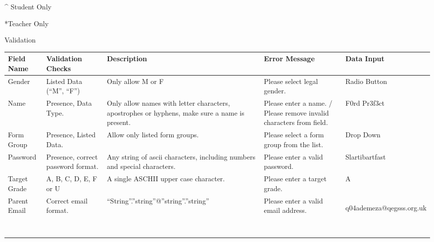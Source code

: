 \documentclass{article}
\begin{document}
\bigskip


\bigskip


\bigskip


\bigskip

\^{} Student Only

*Teacher Only


\bigskip


\bigskip


\bigskip


\bigskip


\bigskip


\bigskip


\bigskip


\bigskip


\bigskip


\bigskip


\bigskip


\bigskip


\bigskip


\bigskip

Validation


\bigskip

\begin{flushleft}
\tablefirsthead{}
\tablehead{}
\tabletail{}
\tablelasttail{}
\begin{supertabular}{|m{0.7156598in}|m{0.69835985in}|m{2.19556in}|m{0.8288598in}|m{1.7691599in}|}
\hline
Field Name &
Validation Checks &
Description &
Error Message &
Data Input\\\hline
Gender &
Listed Data (``M'', ``F'') &
Only allow M or F &
Please select legal gender. &
Radio Button\\\hline
Name &
Presence, Data Type. &
Only allow names with letter characters, apostrophes or hyphens, make sure a name is present. &
Please enter a name. / Please remove invalid characters from field. &
F0rd Pr3f3ct\\\hline
Form Group &
Presence, Listed Data. &
Allow only listed form groups. &
Please select a form group from the list. &
Drop Down\\\hline
Password &
Presence, correct password format. &
Any string of ascii characters, including numbers and special characters. &
Please enter a valid password. &
Slartibartfast\\\hline
Target Grade &
A, B, C, D, E, F or U &
A single ASCHII upper case character. &
Please enter a target grade. &
A\\\hline
Parent Email &
Correct email format. &
{}``String''.''string''@''string''.''string'' &
Please enter a valid email address. &
q04ademeza@qegsss.org.uk

~
\\\hline
\end{supertabular}
\end{flushleft}
\end{document}
